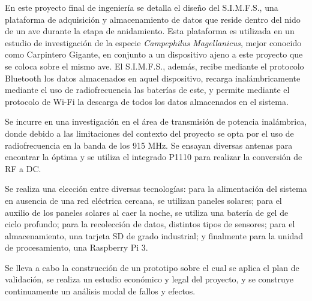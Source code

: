 

En este proyecto final de ingeniería se detalla el diseño del S.I.M.F.S., una plataforma de adquisición y almacenamiento de datos que reside dentro del nido de un ave durante la etapa de anidamiento. Esta plataforma es utilizada en un estudio de investigación de la especie \textit{Campephilus Magellanicus}, mejor conocido como Carpintero Gigante, en conjunto a un dispositivo ajeno a este proyecto que se coloca sobre el mismo ave. El S.I.M.F.S., además, recibe mediante el protocolo Bluetooth los datos almacenados en aquel dispositivo, recarga inalámbricamente mediante el uso de radiofrecuencia las baterías de este, y permite mediante el protocolo de Wi-Fi la descarga de todos los datos almacenados en el sistema. 

Se incurre en una investigación en el área de transmisión de potencia inalámbrica, donde debido a las limitaciones del contexto del proyecto se opta por el uso de radiofrecuencia en la banda de los 915 MHz. Se ensayan diversas antenas para encontrar la óptima y se utiliza el integrado P1110 para realizar la conversión de RF a DC.

Se realiza una elección entre diversas tecnologías: para la alimentación del sistema en ausencia de una red eléctrica cercana, se utilizan paneles solares; para el auxilio de los paneles solares al caer la noche, se utiliza una batería de gel de ciclo profundo; para la recolección de datos, distintos tipos de sensores; para el almacenamiento, una tarjeta SD de grado industrial; y finalmente para la unidad de procesamiento, una Raspberry Pi 3.

Se lleva a cabo la construcción de un prototipo sobre el cual se aplica el plan de validación, se realiza un estudio económico y legal del proyecto, y se construye continuamente un análisis modal de fallos y efectos.





%
